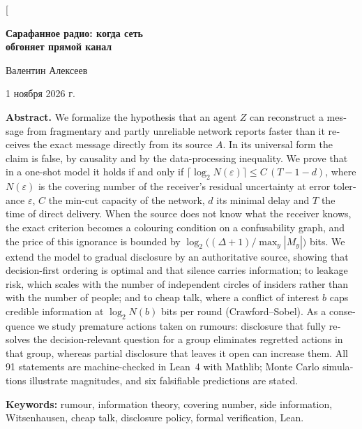 \documentclass[10pt,a4paper,twocolumn]{article}
\theoremstyle{plain}
\begin{document}
\twocolumn[{%
\begin{center}
{\LARGE\bfseries Сарафанное радио: когда сеть\\[2pt] обгоняет прямой канал\par}
\vspace{6pt}
{\large Валентин Алексеев\par}
\vspace{2pt}
{\small 1 ноября 2026 г.\par}
\vspace{10pt}
\begin{minipage}{0.86\textwidth}
\begin{english}
\small
\noindent\textbf{Abstract.}
We formalize the hypothesis that an agent $Z$ can reconstruct a message from fragmentary and partly unreliable network reports faster than it receives the exact message directly from its source $A$. In its universal form the claim is false, by causality and by the data-processing inequality. We prove that in a one-shot model it holds if and only if
$\lceil \log_2 N(\varepsilon) \rceil \le C\,(T-1-d)$, where $N(\varepsilon)$ is the covering number of the receiver's residual uncertainty at error tolerance $\varepsilon$, $C$ the min-cut capacity of the network, $d$ its minimal delay and $T$ the time of direct delivery. When the source does not know what the receiver knows, the exact criterion becomes a colouring condition on a confusability graph, and the price of this ignorance is bounded by $\log_2\big((\Delta+1)/\max_y |M_y|\big)$ bits. We extend the model to gradual disclosure by an authoritative source, showing that decision-first ordering is optimal and that silence carries information; to leakage risk, which scales with the number of independent circles of insiders rather than with the number of people; and to cheap talk, where a conflict of interest $b$ caps credible information at $\log_2 N(b)$ bits per round (Crawford--Sobel). As a consequence we study premature actions taken on rumours: disclosure that fully resolves the decision-relevant question for a group eliminates regretted actions in that group, whereas partial disclosure that leaves it open can increase them. All 91 statements are machine-checked in Lean~4 with Mathlib; Monte Carlo simulations illustrate magnitudes, and six falsifiable predictions are stated.

\smallskip
\noindent\textbf{Keywords:} rumour, information theory, covering number, side information, Witsenhausen, cheap talk, disclosure policy, formal verification, Lean.
\end{english}


\end{minipage}
\end{center}}
\end{document}
